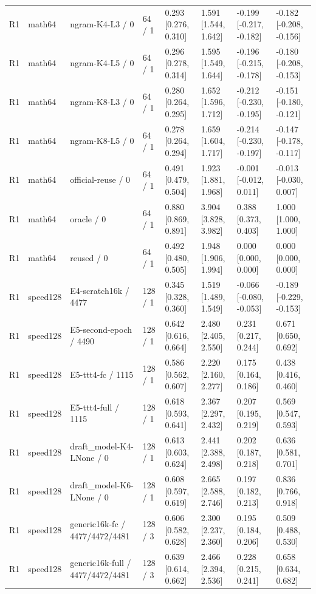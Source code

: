 \begin{tabular}{llllllll}
R1 & math64 & ngram-K4-L3 / 0 & 64 / 1 & 0.293 [0.276, 0.310] & 1.591 [1.544, 1.642] & -0.199 [-0.217, -0.182] & -0.182 [-0.208, -0.156] \\
R1 & math64 & ngram-K4-L5 / 0 & 64 / 1 & 0.296 [0.278, 0.314] & 1.595 [1.549, 1.644] & -0.196 [-0.215, -0.178] & -0.180 [-0.208, -0.153] \\
R1 & math64 & ngram-K8-L3 / 0 & 64 / 1 & 0.280 [0.264, 0.295] & 1.652 [1.596, 1.712] & -0.212 [-0.230, -0.195] & -0.151 [-0.180, -0.121] \\
R1 & math64 & ngram-K8-L5 / 0 & 64 / 1 & 0.278 [0.264, 0.294] & 1.659 [1.604, 1.717] & -0.214 [-0.230, -0.197] & -0.147 [-0.178, -0.117] \\
R1 & math64 & official-reuse / 0 & 64 / 1 & 0.491 [0.479, 0.504] & 1.923 [1.881, 1.968] & -0.001 [-0.012, 0.011] & -0.013 [-0.030, 0.007] \\
R1 & math64 & oracle / 0 & 64 / 1 & 0.880 [0.869, 0.891] & 3.904 [3.828, 3.982] & 0.388 [0.373, 0.403] & 1.000 [1.000, 1.000] \\
R1 & math64 & reused / 0 & 64 / 1 & 0.492 [0.480, 0.505] & 1.948 [1.906, 1.994] & 0.000 [0.000, 0.000] & 0.000 [0.000, 0.000] \\
R1 & speed128 & E4-scratch16k / 4477 & 128 / 1 & 0.345 [0.328, 0.360] & 1.519 [1.489, 1.549] & -0.066 [-0.080, -0.053] & -0.189 [-0.229, -0.153] \\
R1 & speed128 & E5-second-epoch / 4490 & 128 / 1 & 0.642 [0.616, 0.664] & 2.480 [2.405, 2.550] & 0.231 [0.217, 0.244] & 0.671 [0.650, 0.692] \\
R1 & speed128 & E5-ttt4-fc / 1115 & 128 / 1 & 0.586 [0.562, 0.607] & 2.220 [2.160, 2.277] & 0.175 [0.164, 0.186] & 0.438 [0.416, 0.460] \\
R1 & speed128 & E5-ttt4-full / 1115 & 128 / 1 & 0.618 [0.593, 0.641] & 2.367 [2.297, 2.432] & 0.207 [0.195, 0.219] & 0.569 [0.547, 0.593] \\
R1 & speed128 & draft\_model-K4-LNone / 0 & 128 / 1 & 0.613 [0.603, 0.624] & 2.441 [2.388, 2.498] & 0.202 [0.187, 0.218] & 0.636 [0.581, 0.701] \\
R1 & speed128 & draft\_model-K6-LNone / 0 & 128 / 1 & 0.608 [0.597, 0.619] & 2.665 [2.588, 2.746] & 0.197 [0.182, 0.213] & 0.836 [0.766, 0.918] \\
R1 & speed128 & generic16k-fc / 4477/4472/4481 & 128 / 3 & 0.606 [0.582, 0.628] & 2.300 [2.237, 2.360] & 0.195 [0.184, 0.206] & 0.509 [0.488, 0.530] \\
R1 & speed128 & generic16k-full / 4477/4472/4481 & 128 / 3 & 0.639 [0.614, 0.662] & 2.466 [2.394, 2.536] & 0.228 [0.215, 0.241] & 0.658 [0.634, 0.682] \\

\end{tabular}
